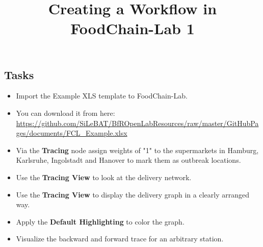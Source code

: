 \documentclass{beamer}
\title{Creating a Workflow in FoodChain-Lab 1}
\date{}
\begin{document}
\maketitle

\section{ }

\subsection{Tasks}
\begin{frame}
	\begin{itemize}
		\item Import the Example XLS template to FoodChain-Lab.
		\item You can download it from here: \url{https://github.com/SiLeBAT/BfROpenLabResources/raw/master/GitHubPages/documents/FCL_Example.xlsx}
		\item Via the \textbf{Tracing} node assign weights of "1" to the supermarkets in Hamburg, Karlsruhe, Ingolstadt and Hanover to mark them as outbreak locations.
		\item Use the \textbf{Tracing View} to look at the delivery network.
    \item Use the \textbf{Tracing View} to display the delivery graph in a clearly arranged way.
    \item Apply the \textbf{Default Highlighting} to color the graph.
    \item Visualize the backward and forward trace for an arbitrary station.
	\end{itemize}
\end{frame}
\end{document}
